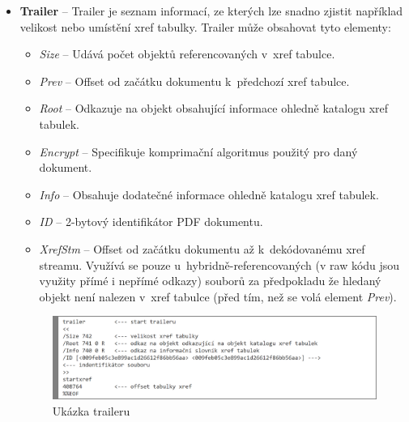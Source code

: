 \begin{itemize}
	\item \textbf{Trailer} --  Trailer je seznam informací, ze kterých lze snadno zjistit například velikost nebo umístění xref tabulky. Trailer může obsahovat tyto elementy:
	\begin{itemize}
		\item \textit{Size} -- Udává počet objektů referencovaných v~xref tabulce. 
		\item \textit{Prev} -- Offset od začátku dokumentu k~předchozí xref tabulce.
		\item \textit{Root} -- Odkazuje na objekt obsahující informace ohledně katalogu xref tabulek.
		\item \textit{Encrypt} -- Specifikuje komprimační algoritmus použitý pro daný dokument.
		\item \textit{Info} -- Obsahuje dodatečné informace ohledně katalogu xref tabulek.
		\item \textit{ID} -- 2-bytový identifikátor PDF dokumentu.
		\item \textit{XrefStm} -- Offset od začátku dokumentu až k~dekódovanému xref streamu. Využívá se pouze u~hybridně-referencovaných (v raw kódu jsou využity přímé i nepřímé odkazy) souborů za předpokladu že hledaný objekt není nalezen v~xref tabulce (před tím, než se volá element \textit{Prev}). 
	\end{itemize}
	\begin{figure}[h!]
	\centering
	\includegraphics[width=15cm]{img/pdf_trailer}
	\caption{Ukázka traileru}
	\label{fig:pdf_trailer}
	\end{figure}
\end{itemize}
